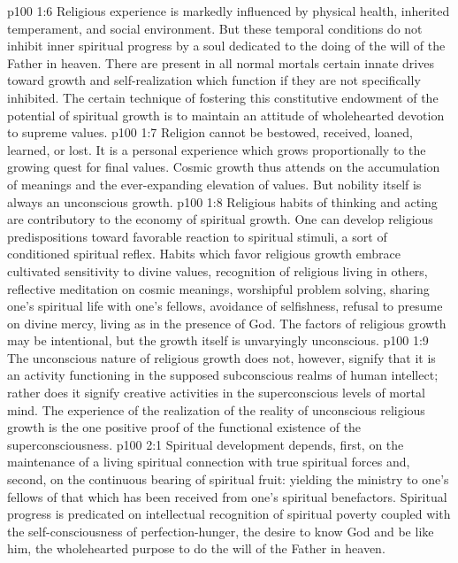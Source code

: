 \pc \vs p100 1:6 Religious experience is markedly influenced by physical health, inherited temperament, and social environment. But these temporal conditions do not inhibit inner spiritual progress by a soul dedicated to the doing of the will of the Father in heaven. There are present in all normal mortals certain innate drives toward growth and self\hyp{}realization which function if they are not specifically inhibited. The certain technique of fostering this constitutive endowment of the potential of spiritual growth is to maintain an attitude of wholehearted devotion to supreme values.
\vs p100 1:7 Religion cannot be bestowed, received, loaned, learned, or lost. It is a personal experience which grows proportionally to the growing quest for final values. Cosmic growth thus attends on the accumulation of meanings and the ever\hyp{}expanding elevation of values. But nobility itself is always an unconscious growth.
\vs p100 1:8 Religious habits of thinking and acting are contributory to the economy of spiritual growth. One can develop religious predispositions toward favorable reaction to spiritual stimuli, a sort of conditioned spiritual reflex. Habits which favor religious growth embrace cultivated sensitivity to divine values, recognition of religious living in others, reflective meditation on cosmic meanings, worshipful problem solving, sharing one’s spiritual life with one’s fellows, avoidance of selfishness, refusal to presume on divine mercy, living as in the presence of God. The factors of religious growth may be intentional, but the growth itself is unvaryingly unconscious.
\vs p100 1:9 The unconscious nature of religious growth does not, however, signify that it is an activity functioning in the supposed subconscious realms of human intellect; rather does it signify creative activities in the superconscious levels of mortal mind. The experience of the realization of the reality of unconscious religious growth is the one positive proof of the functional existence of the superconsciousness.\plusone
{}
\vs p100 2:1 Spiritual development depends, first, on the maintenance of a living spiritual connection with true spiritual forces and, second, on the continuous bearing of spiritual fruit: yielding the ministry to one’s fellows of that which has been received from one’s spiritual benefactors. Spiritual progress is predicated on intellectual recognition of spiritual poverty coupled with the self\hyp{}consciousness of perfection\hyp{}hunger, the desire to know God and be like him, the wholehearted purpose to do the will of the Father in heaven.
